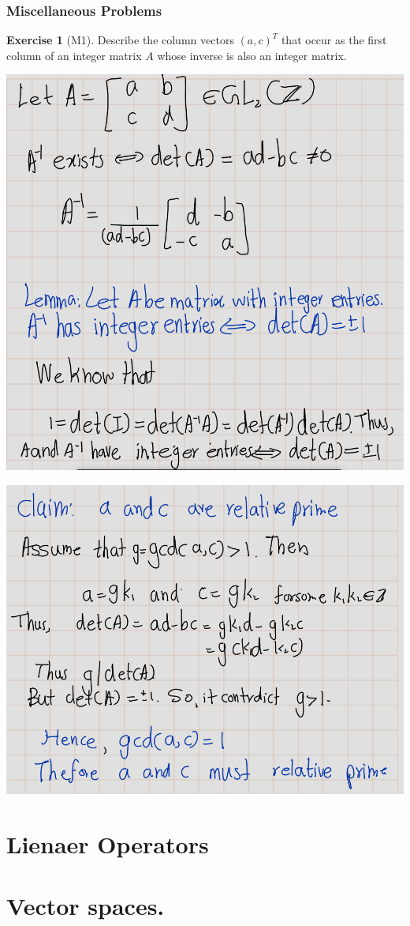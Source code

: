 \documentclass[
]{book}
\theoremstyle{definition}
\theoremstyle{definition}
\theoremstyle{definition}
\newtheorem{exercise}{Exercise}[chapter]
\theoremstyle{definition}
\theoremstyle{remark}
\begin{document}
\hypertarget{miscellaneous-problems}{%
\subsection{Miscellaneous Problems}\label{miscellaneous-problems}}

\begin{exercise}[M1]
\protect\hypertarget{exr:unnamed-chunk-101}{}\label{exr:unnamed-chunk-101}Describe the column vectors \((a, c)^T\) that occur as the first column of an integer matrix \(A\) whose inverse is also an integer matrix.
\end{exercise}

\includegraphics{figures/ch_2/fig47.png}

\includegraphics{figures/ch_2/fig48.png}

\hypertarget{lienaer-operators}{%
\chapter{Lienaer Operators}\label{lienaer-operators}}

\hypertarget{vector-spaces.}{%
\chapter{Vector spaces.}\label{vector-spaces.}}

  
\end{document}

